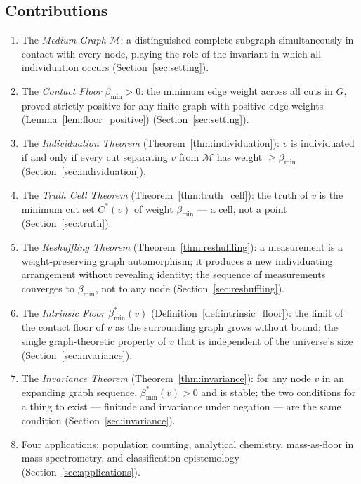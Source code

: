 \documentclass[11pt,twocolumn,a4paper]{article}
\theoremstyle{plain}
\theoremstyle{definition}
\theoremstyle{remark}
\newcommand{\med}{\mathcal{M}}
\newcommand{\bmin}{\beta_{\min}}
\begin{document}
\subsection{Contributions}

\begin{enumerate}[label=(\roman*)]
  \item The \emph{Medium Graph} $\med$: a distinguished complete subgraph
  simultaneously in contact with every node, playing the role of the
  invariant in which all individuation occurs
  (Section~\ref{sec:setting}).

  \item The \emph{Contact Floor} $\bmin > 0$: the minimum edge weight
  across all cuts in $G$, proved strictly positive for any finite graph
  with positive edge weights (Lemma~\ref{lem:floor_positive})
  (Section~\ref{sec:setting}).

  \item The \emph{Individuation Theorem} (Theorem~\ref{thm:individuation}):
  $v$ is individuated if and only if every cut separating $v$ from $\med$
  has weight $\geq \bmin$ (Section~\ref{sec:individuation}).

  \item The \emph{Truth Cell Theorem} (Theorem~\ref{thm:truth_cell}): the
  truth of $v$ is the minimum cut set $C^*(v)$ of weight $\bmin$ --- a
  cell, not a point (Section~\ref{sec:truth}).

  \item The \emph{Reshuffling Theorem} (Theorem~\ref{thm:reshuffling}): a
  measurement is a weight-preserving graph automorphism; it produces a new
  individuating arrangement without revealing identity; the sequence of
  measurements converges to $\bmin$, not to any node
  (Section~\ref{sec:reshuffling}).

  \item The \emph{Intrinsic Floor} $\bmin^*(v)$
  (Definition~\ref{def:intrinsic_floor}): the limit of the contact floor
  of $v$ as the surrounding graph grows without bound; the single
  graph-theoretic property of $v$ that is independent of the universe's
  size (Section~\ref{sec:invariance}).

  \item The \emph{Invariance Theorem} (Theorem~\ref{thm:invariance}): for
  any node $v$ in an expanding graph sequence, $\bmin^*(v) > 0$ and is
  stable; the two conditions for a thing to exist --- finitude and
  invariance under negation --- are the same condition
  (Section~\ref{sec:invariance}).

  \item Four applications: population counting, analytical chemistry,
  mass-as-floor in mass spectrometry, and classification epistemology
  (Section~\ref{sec:applications}).
\end{enumerate}
\end{document}
